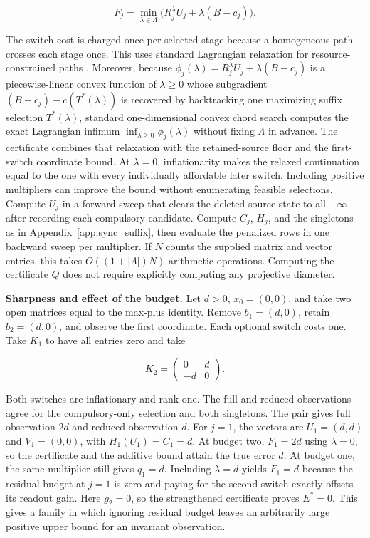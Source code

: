 \documentclass[11pt,letterpaper]{article}
\begin{document}
\[
F_j=\min_{\lambda\in\Lambda}\bigl(R_j^\lambda U_j+\lambda(B-c_j)\bigr).
\]

The switch cost is charged once per selected stage because a homogeneous path crosses each stage once. This uses standard Lagrangian relaxation for resource-constrained paths \citep{Handler1980}. Moreover, because $\phi_j(\lambda)=R_j^\lambda U_j+\lambda(B-c_j)$ is a piecewise-linear convex function of $\lambda\ge0$ whose subgradient $(B-c_j)-c(T^*(\lambda))$ is recovered by backtracking one maximizing suffix selection $T^*(\lambda)$, standard one-dimensional convex chord search \citep{Handler1980} computes the exact Lagrangian infimum $\inf_{\lambda\ge0}\phi_j(\lambda)$ without fixing $\Lambda$ in advance. The certificate combines that relaxation with the retained-source floor and the first-switch coordinate bound. At $\lambda=0$, inflationarity makes the relaxed continuation equal to the one with every individually affordable later switch. Including positive multipliers can improve the bound without enumerating feasible selections. Compute $U_j$ in a forward sweep that clears the deleted-source state to all $-\infty$ after recording each compulsory candidate. Compute $C_j$, $H_j$, and the singletons as in Appendix~\ref{app:sync_suffix}, then evaluate the penalized rows in one backward sweep per multiplier. If $N$ counts the supplied matrix and vector entries, this takes $O((1+|\Lambda|)N)$ arithmetic operations. Computing the certificate $Q$ does not require explicitly computing any projective diameter.

\noindent\textbf{Sharpness and effect of the budget.} Let $d>0$, $x_0=(0,0)$, and take two open matrices equal to the max-plus identity. Remove $b_1=(d,0)$, retain $b_2=(d,0)$, and observe the first coordinate. Each optional switch costs one. Take $K_1$ to have all entries zero and take

\[
K_2=\begin{pmatrix}0&d\\-d&0\end{pmatrix}.
\]

Both switches are inflationary and rank one. The full and reduced observations agree for the compulsory-only selection and both singletons. The pair gives full observation $2d$ and reduced observation $d$. For $j=1$, the vectors are $U_1=(d,d)$ and $V_1=(0,0)$, with $H_1(U_1)=C_1=d$. At budget two, $F_1=2d$ using $\lambda=0$, so the certificate and the additive bound attain the true error $d$. At budget one, the same multiplier still gives $q_1=d$. Including $\lambda=d$ yields $F_1=d$ because the residual budget at $j=1$ is zero and paying for the second switch exactly offsets its readout gain. Here $g_2=0$, so the strengthened certificate proves $E^*=0$. This gives a family in which ignoring residual budget leaves an arbitrarily large positive upper bound for an invariant observation.
\end{document}

